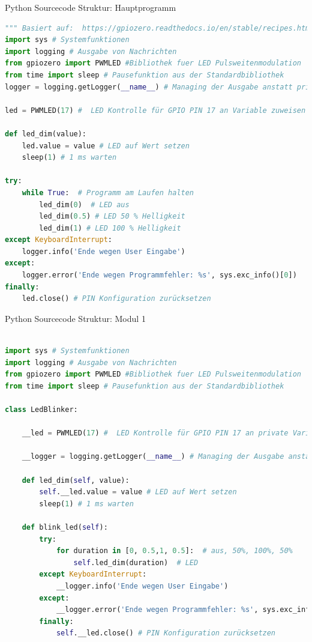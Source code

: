 \begin{frame}[fragile]{Python Sourcecode Struktur: Hauptprogramm}
\begin{lstlisting}[language=Python]
""" Basiert auf:  https://gpiozero.readthedocs.io/en/stable/recipes.html """
import sys # Systemfunktionen
import logging # Ausgabe von Nachrichten
from gpiozero import PWMLED #Bibliothek fuer LED Pulsweitenmodulation
from time import sleep # Pausefunktion aus der Standardbibliothek
logger = logging.getLogger(__name__) # Managing der Ausgabe anstatt print() Funktion

led = PWMLED(17) #  LED Kontrolle für GPIO PIN 17 an Variable zuweisen

def led_dim(value):
    led.value = value # LED auf Wert setzen
    sleep(1) # 1 ms warten

try:
    while True:  # Programm am Laufen halten
        led_dim(0)  # LED aus
        led_dim(0.5) # LED 50 % Helligkeit
        led_dim(1) # LED 100 % Helligkeit
except KeyboardInterrupt:
    logger.info('Ende wegen User Eingabe')
except:
    logger.error('Ende wegen Programmfehler: %s', sys.exc_info()[0])
finally:
    led.close() # PIN Konfiguration zurücksetzen
\end{lstlisting}
\end{frame}


\begin{frame}[fragile]{Python Sourcecode Struktur: Modul 1}
\begin{lstlisting}[language=Python]

import sys # Systemfunktionen
import logging # Ausgabe von Nachrichten
from gpiozero import PWMLED #Bibliothek fuer LED Pulsweitenmodulation
from time import sleep # Pausefunktion aus der Standardbibliothek

class LedBlinker:

    __led = PWMLED(17) #  LED Kontrolle für GPIO PIN 17 an private Variable zuweisen

    __logger = logging.getLogger(__name__) # Managing der Ausgabe anstatt print() Funktion

    def led_dim(self, value):
        self.__led.value = value # LED auf Wert setzen
        sleep(1) # 1 ms warten

    def blink_led(self):
        try:
            for duration in [0, 0.5,1, 0.5]:  # aus, 50%, 100%, 50%
                self.led_dim(duration)  # LED
        except KeyboardInterrupt:
            __logger.info('Ende wegen User Eingabe')
        except:
            __logger.error('Ende wegen Programmfehler: %s', sys.exc_info()[0]) # siehe https://docs.python.org/3/tutorial/errors.html
        finally:
            self.__led.close() # PIN Konfiguration zurücksetzen
\end{lstlisting}
\end{frame}


